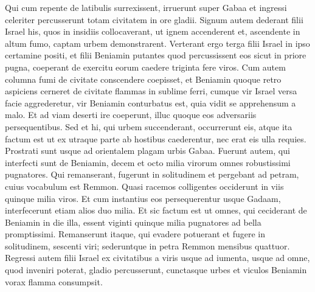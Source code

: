 \begin{biblechapter}
\verse Qui cum repente de latibulis surrexissent, irruerunt super Gabaa et ingressi celeriter percusserunt totam civitatem in ore gladii. 
\verse Signum autem dederant filii Israel his, quos in insidiis collocaverant, ut ignem accenderent et, ascendente in altum fumo, captam urbem demonstrarent. 
\verse Verterant ergo terga filii Israel in ipso certamine positi, et filii Beniamin putantes quod percussissent eos sicut in priore pugna, coeperant de exercitu eorum caedere triginta fere viros. 
\verse Cum autem columna fumi de civitate conscendere coepisset, et Beniamin quoque retro aspiciens cerneret de civitate flammas in sublime ferri, 
\verse cumque vir Israel versa facie aggrederetur, vir Beniamin conturbatus est, quia vidit se apprehensum a malo. 
\verse Et ad viam deserti ire coeperunt, illuc quoque eos adversariis persequentibus. Sed et hi, qui urbem succenderant, occurrerunt eis, 
\verse atque ita factum est ut ex utraque parte ab hostibus caederentur, nec erat eis ulla requies. Prostrati sunt usque ad orientalem plagam urbis Gabaa.  
\verse Fuerunt autem, qui interfecti sunt de Beniamin, decem et octo milia virorum omnes robustissimi pugnatores. 
\verse Qui remanserant, fugerunt in solitudinem et pergebant ad petram, cuius vocabulum est Remmon. Quasi racemos colligentes occiderunt in viis quinque milia viros. Et cum instantius eos persequerentur usque Gadaam, interfecerunt etiam alios duo milia. 
\verse Et sic factum est ut omnes, qui ceciderant de Beniamin in die illa, essent viginti quinque milia pugnatores ad bella promptissimi. 
\verse Remanserunt itaque, qui evadere potuerant et fugere in solitudinem, sescenti viri; sederuntque in petra Remmon mensibus quattuor. 
\verse Regressi autem filii Israel ex civitatibus a viris usque ad iumenta, usque ad omne, quod inveniri poterat, gladio percusserunt, cunctasque urbes et viculos Beniamin vorax flamma consumpsit. 
\end{biblechapter}

